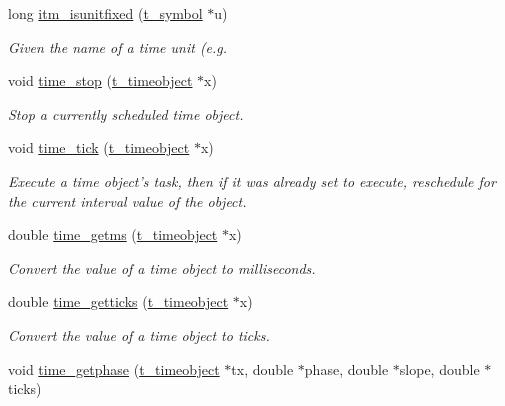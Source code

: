 \begin{DoxyCompactItemize}
long \hyperlink{group__time_ga6950c5550d8beec9d1df56c96b3c9c88}{itm\_\-isunitfixed} (\hyperlink{structt__symbol}{t\_\-symbol} $\ast$u)
\begin{DoxyCompactList}\small\item\em Given the name of a time unit (e.g. \item\end{DoxyCompactList}\item 
void \hyperlink{group__time_ga6724fc34703298b8dbb12cfe17ef325e}{time\_\-stop} (\hyperlink{group__time_gab568d2ffd4d84ca17c0b90cf2f7c6a40}{t\_\-timeobject} $\ast$x)
\begin{DoxyCompactList}\small\item\em Stop a currently scheduled time object. \item\end{DoxyCompactList}\item 
void \hyperlink{group__time_ga31b3eecc1bd31944239fab1b6c309b5b}{time\_\-tick} (\hyperlink{group__time_gab568d2ffd4d84ca17c0b90cf2f7c6a40}{t\_\-timeobject} $\ast$x)
\begin{DoxyCompactList}\small\item\em Execute a time object's task, then if it was already set to execute, reschedule for the current interval value of the object. \item\end{DoxyCompactList}\item 
double \hyperlink{group__time_ga714ddc564124f89899dc619137f5c64d}{time\_\-getms} (\hyperlink{group__time_gab568d2ffd4d84ca17c0b90cf2f7c6a40}{t\_\-timeobject} $\ast$x)
\begin{DoxyCompactList}\small\item\em Convert the value of a time object to milliseconds. \item\end{DoxyCompactList}\item 
double \hyperlink{group__time_ga4f47a0932158cafd04fb2e0cc928b4cc}{time\_\-getticks} (\hyperlink{group__time_gab568d2ffd4d84ca17c0b90cf2f7c6a40}{t\_\-timeobject} $\ast$x)
\begin{DoxyCompactList}\small\item\em Convert the value of a time object to ticks. \item\end{DoxyCompactList}\item 
void \hyperlink{group__time_ga2a96b168022b712f38245517a9e20a14}{time\_\-getphase} (\hyperlink{group__time_gab568d2ffd4d84ca17c0b90cf2f7c6a40}{t\_\-timeobject} $\ast$tx, double $\ast$phase, double $\ast$slope, double $\ast$ticks)

\end{DoxyCompactItemize}
